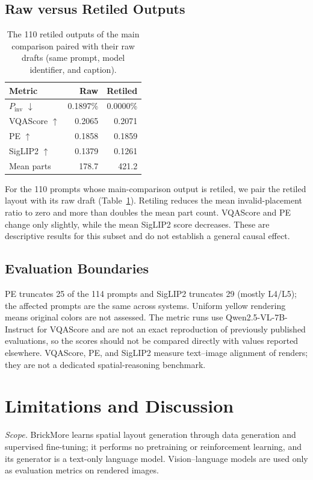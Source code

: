 \documentclass[letterpaper]{article} %
\begin{document}
\subsection{Raw versus Retiled Outputs}
\begin{table}[t]
\centering
\small
\begin{tabular}{lrr}
\toprule
Metric & Raw & Retiled \\
\midrule
$P_{\mathrm{inv}}$ $\downarrow$ & 0.1897\% & 0.0000\% \\
VQAScore $\uparrow$ & 0.2065 & 0.2071 \\
PE $\uparrow$ & 0.1858 & 0.1859 \\
SigLIP2 $\uparrow$ & 0.1379 & 0.1261 \\
Mean parts & 178.7 & 421.2 \\
\bottomrule
\end{tabular}
\caption{The 110 retiled outputs of the main comparison paired with their raw drafts (same prompt, model identifier, and caption).}
\label{tab:raw-retiled}
\end{table}
For the 110 prompts whose main-comparison output is retiled, we pair the retiled layout with its raw draft (Table~\ref{tab:raw-retiled}). Retiling reduces the mean invalid-placement ratio to zero and more than doubles the mean part count. VQAScore and PE change only slightly, while the mean SigLIP2 score decreases. These are descriptive results for this subset and do not establish a general causal effect.

\subsection{Evaluation Boundaries}
PE truncates 25 of the 114 prompts and SigLIP2 truncates 29 (mostly L4/L5); the affected prompts are the same across systems. Uniform yellow rendering means original colors are not assessed. The metric runs use Qwen2.5-VL-7B-Instruct for VQAScore and are not an exact reproduction of previously published evaluations, so the scores should not be compared directly with values reported elsewhere. VQAScore, PE, and SigLIP2 measure text--image alignment of renders; they are not a dedicated spatial-reasoning benchmark.

\section{Limitations and Discussion}
\label{sec:limitations}
\emph{Scope.} BrickMore learns spatial layout generation through data generation and supervised fine-tuning; it performs no pretraining or reinforcement learning, and its generator is a text-only language model. Vision--language models are used only as evaluation metrics on rendered images.
\end{document}
